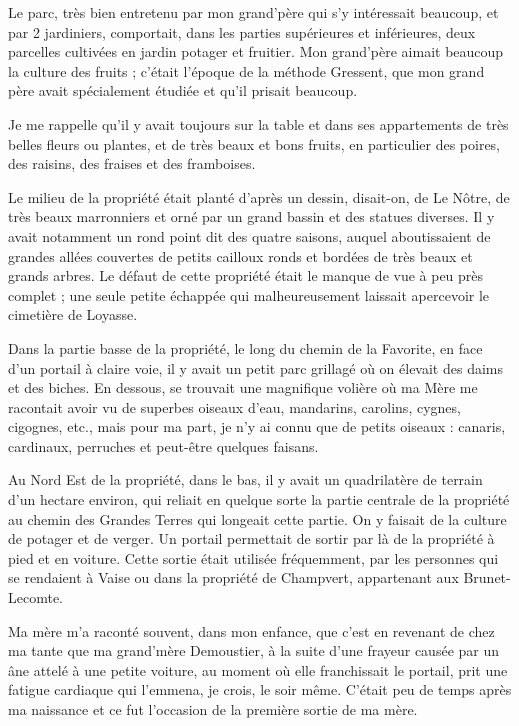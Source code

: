 \documentclass[11pt,a4paper]{report}
\begin{document}
Le parc, très bien entretenu par mon grand'père qui s'y intéressait beaucoup, et par 2 jardiniers, comportait, dans les parties supérieures et inférieures, deux parcelles cultivées en jardin potager et fruitier. Mon grand'père aimait beaucoup la culture des fruits ; c'était l'époque de la méthode Gressent, que mon grand père avait spécialement étudiée et qu'il prisait beaucoup.

Je me rappelle qu'il y avait toujours sur la table et dans ses appartements de très belles fleurs ou plantes, et de très beaux et bons fruits, en particulier des poires, des raisins, des fraises et des framboises.

Le milieu de la propriété était planté d'après un dessin, disait-on, de Le Nôtre, de très beaux marronniers et orné par un grand bassin et des statues diverses. Il y avait notamment un rond point dit des quatre saisons, auquel aboutissaient de grandes allées couvertes de petits cailloux ronds et bordées de très beaux et grands arbres. Le défaut de cette propriété était le manque de vue à peu près complet ; une seule petite échappée qui malheureusement laissait apercevoir le cimetière de Loyasse.

Dans la partie basse de la propriété, le long du chemin de la Favorite, en face d'un portail à claire voie, il y avait un petit parc grillagé où on élevait des daims et des biches. En dessous, se trouvait une magnifique volière où ma Mère me racontait avoir vu de superbes oiseaux d'eau, mandarins, carolins, cygnes, cigognes, etc., mais pour ma part, je n'y ai connu que de petits oiseaux : canaris, cardinaux, perruches et peut-être quelques faisans.

Au Nord Est de la propriété, dans le bas, il y avait un quadrilatère de terrain d'un hectare environ, qui reliait en quelque sorte la partie centrale de la propriété au chemin des Grandes Terres qui longeait cette partie. On y faisait de la culture de potager et de verger. Un portail permettait de sortir par là de la propriété à pied et en voiture. Cette sortie était utilisée fréquemment, par les personnes qui se rendaient à Vaise ou dans la propriété de Champvert, appartenant aux Brunet-Lecomte.

Ma mère m'a raconté souvent, dans mon enfance, que c'est en revenant de chez ma tante que ma grand'mère Demoustier, à la suite d'une frayeur causée par un âne attelé à une petite voiture, au moment où elle franchissait le portail, prit une fatigue cardiaque qui l'emmena, je crois, le soir même. C'était peu de temps après ma naissance et ce fut l'occasion de la première sortie de ma mère.
\end{document}
